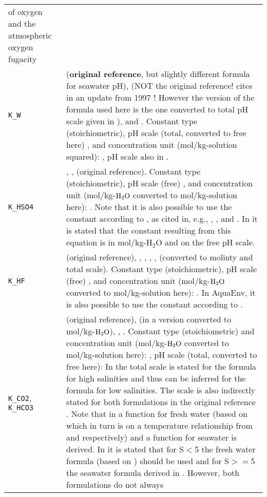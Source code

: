 \documentclass[article,nojss]{jss}
\begin{document}
\begin{footnotesize}
\begin{longtable}{p{}|p{}}
of oxygen \citep[][p. 41, 1029]{Atkins1996} and the atmospheric oxygen fugacity \citep{Williams2004}\\
\texttt{K\_W}       & \citet[p.670]{Millero1995} (\textbf{original reference}, but slightly different formula for seawater pH), \citet[chapter 5, p. 18]{DOE1994} (NOT the original reference! \citet{DOE1994} cites in an update from 1997 \citet{Millero1995}! 
However the version of the formula used here is the one converted to total pH scale given in \citet{DOE1994}), and \citet[p. 258]{Zeebe2001}. Constant type (stoichiometric), 
pH scale (total, converted to free here) , and 
concentration unit (mol/kg-solution squared): \citet[chapter 5, p. 12,18]{DOE1994}, pH scale also in \citet[p. 258]{Zeebe2001}.\\
\texttt{K\_HSO4}     & \citet[chapter 5 page 13]{DOE1994}, \citet[p. 260]{Zeebe2001}, \citet{Dickson1990a} (original reference). Constant type (stoichiometric), pH scale (free) , and 
concentration unit (mol/kg-$\rm H_2O$ converted to mol/kg-solution here): \citet[chapter 5, p. 13]{DOE1994}. Note that it is also possible to use the constant according to \cite{Khoo1977}, as cited in, e.g.,  \cite{Roy1993b}, \cite{Millero1995}, and \cite{Lewis1998}. In \cite{Lewis1998} it is stated that the constant resulting from this equation is in mol/kg-H$_2$O and on the free pH scale.\\
\texttt{K\_HF}       & \citet[p. 91]{Dickson1979} (original reference), \citet[c. 5, p. 15]{DOE1994}, \citet[p. 257]{Roy1993b}, \citet[p. 1783]{Dickson1987}, \citet[p. 664]{Millero1995}, \citet[p. 260]{Zeebe2001} 
(converted to molinty and total scale).  Constant type (stoichiometric), pH scale (free) , and 
concentration unit (mol/kg-$\rm H_2O$ converted to mol/kg-solution here): \citet[chapter 5, p. 15, 16]{DOE1994}. In \textsf{AquaEnv}, it is also possible to use the constant according to \cite{Perez1987a}. \\
\texttt{K\_CO2}, \texttt{K\_HCO3}  & \citet[p. 254]{Roy1993b} (original reference), \citet[chapter 5, p.14]{DOE1994} (in a version converted to mol/kg-$\rm H_2O$), \citet[p. 664]{Millero1995}, \citet[p. 255]{Zeebe2001}.
Constant type (stoichiometric) and  concentration unit (mol/kg-$\rm H_2O$ converted to mol/kg-solution here): \citet[chapter 5, p. 14, 15]{DOE1994}, pH scale (total, converted to free here): 
In \citet[chapter 5, p. 12]{DOE1994} the total scale is stated for the formula for high salinities and thus can be inferred for the formula for low salinities. 
The scale is also indirectly stated for both formulations in the original reference \citet{Roy1993b}. Note that in \citet{Roy1993b} a function for fresh water (based on \cite{Millero1979} which in turn is on a temperature relationship from \cite{Harned1943} and \cite{Harned1941} respectively) and a function for seawater is derived. In \citet{Millero1995} it is stated that for S$<$5 the fresh water formula (based on \cite{Millero1979}) should be used and for S$>=$5 the seawater formula derived in \citet{Roy1993b}. However, both formulations do not always 

\end{longtable}
\end{footnotesize}
\end{document}

